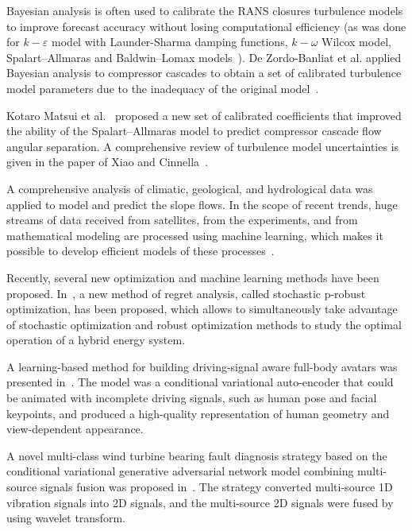 \documentclass[mathematics,article,accept,pdftex,moreauthors]{Definitions/mdpi}
\begin{document}
Bayesian analysis is often used to calibrate the RANS closures turbulence models to improve forecast accuracy without losing computational efficiency (as was done for $k{-}\varepsilon$ model with Launder-Sharma damping functions, $k{-}\omega$ Wilcox model, Spalart--Allmaras and Baldwin--Lomax models~\cite{Edeling2014a,Edeling2014b}). De Zordo-Banliat et al. applied Bayesian analysis to compressor cascades to obtain a set of calibrated turbulence model parameters due to the inadequacy of the original model~\cite{deZordoBanliat2020}. 

Kotaro Matsui et al.~\cite{Matsui2021} proposed a new set of calibrated coefficients that improved the ability of the Spalart--Allmaras model to predict compressor cascade flow angular separation. A comprehensive review of turbulence model uncertainties is given in the paper of Xiao and Cinnella~\cite{Xiao2019}.

A comprehensive analysis of climatic, geological, and hydrological data was applied to model and predict the slope flows. In the scope of recent trends, huge streams of data received from satellites, from the experiments, and from mathematical modeling are processed using machine learning, which makes it possible to develop efficient models of these processes~\cite{GeoML, Ma2020}.


Recently, several new optimization and machine learning methods have been proposed.
In~\cite{YuWuWang2022}, a new method of regret analysis, called stochastic p-robust optimization, has been proposed, which allows to simultaneously take advantage of stochastic optimization and robust optimization methods to study the optimal operation of a hybrid energy system.

A learning-based method for building driving-signal aware full-body avatars was presented in~\cite{BagautdinovWuSimon2021}. The model was a conditional variational auto-encoder that could be animated with incomplete driving signals, such as human pose and facial keypoints, and produced a high-quality representation of human geometry and view-dependent appearance. 

A novel multi-class wind turbine bearing fault diagnosis strategy based on the conditional variational generative adversarial network model combining multi-source signals fusion was proposed in~\cite{ZhangZhangCai2022}. The strategy converted multi-source 1D vibration signals into 2D signals, and the multi-source 2D signals were fused by using wavelet transform.
\end{document}
